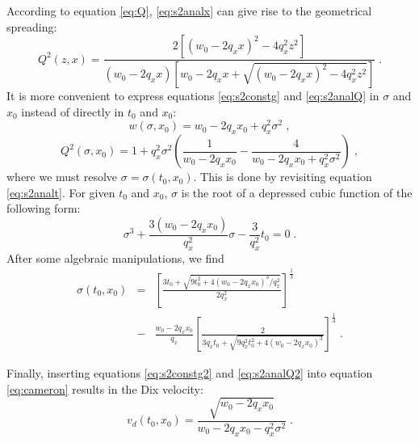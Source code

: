 According to equation \ref{eq:Q}, \ref{eq:s2analx} can give rise to the geometrical spreading:
\begin{equation}
\label{eq:s2analQ}
Q^2 (z,x) =
\frac{2 [(w_0 - 2 q_x x)^2 - 4 q_x^2 z^2]}
{(w_0 - 2 q_x x) \left[ w_0 - 2 q_x x + \sqrt{(w_0 - 2 q_x x)^2 - 4 q_x^2 z^2} \right]}\;.
\end{equation}
It is more convenient to express equations \ref{eq:s2constg} and \ref{eq:s2analQ} in $\sigma$ and $x_0$ instead 
of directly in $t_0$ and $x_0$:
\begin{equation}
\label{eq:s2constg2}
w (\sigma,x_0) = w_0 - 2 q_x x_0 + q_x^2 \sigma^2\;,
\end{equation}
\begin{equation}
\label{eq:s2analQ2}
Q^2 (\sigma,x_0) = 1 +
q_x^2 \sigma^2 \left( \frac{1}{w_0 - 2 q_x x_0} - \frac{4}{w_0 - 2 q_x x_0 + q_x^2 \sigma^2} \right)\;,
\end{equation}
where we must resolve $\sigma = \sigma (t_0,x_0)$. This is done by revisiting equation \ref{eq:s2analt}. For 
given $t_0$ and $x_0$, $\sigma$ is the root of a depressed cubic function of the following form:
\begin{equation}
\label{eq:depcubic}
\sigma^3 + \frac{3 (w_0 - 2 q_x x_0)}{q_x^2} \sigma - \frac{3}{q_x^2} t_0 = 0\;.
\end{equation}
After some algebraic manipulations, we find
\begin{eqnarray}
\label{eq:rootdepcubic}
\sigma (t_0,x_0) & = & 
\left[ \frac{3 t_0 + \sqrt{9 t_0^2 + 4 (w_0 - 2 q_x x_0)^3 / q_x^2}}{2 q_x^2} \right]^{\frac{1}{3}} \nonumber \\
& - & \frac{w_0 - 2 q_x x_0}{q_x} 
\left[ \frac{2}{3 q_x t_0 + \sqrt{9 q_x^2 t_0^2 + 4 (w_0 - 2 q_x x_0)^3}} \right]^{\frac{1}{3}}\;.
\end{eqnarray}

Finally, inserting equations \ref{eq:s2constg2} and \ref{eq:s2analQ2} into equation \ref{eq:cameron} results 
in the Dix velocity:
\begin{equation}
\label{eq:s2analvd}
v_d (t_0,x_0) = \frac{\sqrt{w_0 - 2 q_x x_0}}{w_0 - 2 q_x x_0 - q_x^2 \sigma^2}\;.
\end{equation}


